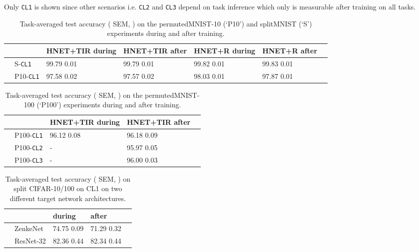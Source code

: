 \documentclass{article}
\begin{document}
Only \texttt{CL1} is shown since other scenarios i.e. \texttt{CL2} and \texttt{CL3} depend on task inference which only is measurable after training on all tasks.

\begin{table*}[ht!]
 \centering
  \caption{Task-averaged test accuracy ( SEM, ) on the permutedMNIST-10 (`P10') and splitMNIST (`S') experiments during and after training.}
  \begin{small}
  \begin{tabular}{llp{1.65cm}p{1.65cm}p{1.62cm}p{1.62cm}p{1.62cm}} \toprule
     & & \textbf{HNET+TIR during} & \textbf{HNET+TIR after} & \textbf{HNET+R during} & \textbf{HNET+R after} \\ \midrule \midrule
     \multirow{3}{*}{}
    & S-\texttt{CL1} & 99.79   0.01 & 99.79   0.01 & 99.82   0.01 & 99.83   0.01 \\
    \midrule
    \multirow{3}{*}{}
    & P10-\texttt{CL1} & 97.58   0.02 &  97.57   0.02 & 98.03   0.01 & 97.87   0.01  \\
    \bottomrule
  \end{tabular}
  \label{tab:mnist-split-acc-quantification}
  \end{small}
\end{table*}

\begin{table*}[ht!]
 \centering
  \caption{Task-averaged test accuracy ( SEM, ) on the  permutedMNIST-100 (`P100') experiments during and after training.}
  \begin{small}
  \begin{tabular}{llp{1.62cm}p{1.62cm}p{1.62cm}} \toprule
     & & \textbf{HNET+TIR during} & \textbf{HNET+TIR after} \\ \midrule \midrule
    \multirow{3}{*}{}
    & P100-\texttt{CL1} & 96.12   0.08 & 96.18   0.09  \\
    &  P100-\texttt{CL2} & \qquad - & 95.97   0.05 \\
    & P100-\texttt{CL3} &  \qquad - & 96.00   0.03 \\
    \bottomrule
  \end{tabular}
  \label{tab:mnist-perm-acc-quantification}
  \end{small}
\end{table*}

\begin{table*}[ht!]
 \centering
  \caption{Task-averaged test accuracy ( SEM, ) on split CIFAR-10/100 on CL1 on two different target network architectures.}
  \begin{small}
  \begin{tabular}{llp{1.62cm}p{2cm}p{2cm}} \toprule
     & & \textbf{during} & \textbf{after} \\ \midrule \midrule
    \multirow{3}{*}{}
    & ZenkeNet & 74.75  0.09 & 71.29  0.32  \\
    &  ResNet-32 & 82.36  0.44 & 82.34  0.44 \\
    \bottomrule
  \end{tabular}
  \label{tab:cifar-acc-quantification}
  \end{small}
\end{table*}
\end{document}
